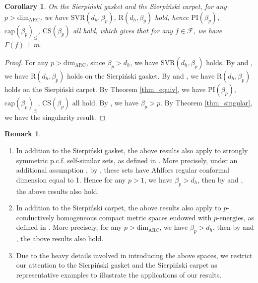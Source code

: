 \documentclass[11pt,a4paper]{article}
\numberwithin{equation}{section}
\theoremstyle{plain}
\newtheorem{corollary}[theorem]{Corollary}
\theoremstyle{definition}
\newtheorem{remark}[theorem]{Remark}
\begin{document}
\begin{corollary}\label{cor_SGSC}
On the Sierpi\'nski gasket and the Sierpi\'nski carpet, for any $p>\mathrm{dim}_{\mathrm{ARC}}$, we have \hyperlink{eq_SVRdb}{$\text{SVR}(d_h,\beta_p)$}, \hyperlink{eq_Rdb}{$\text{R}(d_h,\beta_p)$} hold, hence \hyperlink{eq_PIbeta}{$\text{PI}(\beta_p)$}, \hyperlink{eq_capbeta}{$\text{cap}(\beta_p)_\le$}, \hyperlink{eq_CSbeta}{$\text{CS}(\beta_p)$} all hold, which gives that for any $f\in\mathcal{F}$, we have $\Gamma(f)\perp m$.
\end{corollary}

\begin{proof}
For any $p>\mathrm{dim}_{\mathrm{ARC}}$, since $\beta_p>d_h$, we have \hyperlink{eq_SVRdb}{$\text{SVR}(d_h,\beta_p)$} holds. By \cite[Theorem 4.6]{Kig23} and \cite[Theorem 8.30]{KS24a}, we have \hyperlink{eq_Rdb}{$\text{R}(d_h,\beta_p)$} holds on the Sierpi\'nski gasket. By \cite[Theorem 3.21]{Kig23} and \cite[Theorem 8.19, Remark 8.20]{KS24a}, we have \hyperlink{eq_Rdb}{$\text{R}(d_h,\beta_p)$} holds on the Sierpi\'nski carpet. By Theorem \ref{thm_equiv}, we have \hyperlink{eq_PIbeta}{$\text{PI}(\beta_p)$}, \hyperlink{eq_capbeta}{$\text{cap}(\beta_p)_\le$}, \hyperlink{eq_CSbeta}{$\text{CS}(\beta_p)$} all hold. By \cite[Theorem 9.13, Theorem 9.8]{KS24a}, we have $\beta_p>p$. By Theorem \ref{thm_singular}, we have the singularity result.
\end{proof}

\begin{remark}\hspace{0em}
\begin{enumerate}[label=(\arabic*)]
\item In addition to the Sierpi\'nski gasket, the above results also apply to strongly symmetric p.c.f. self-similar sets, as defined in \cite[Definition 3.8.3, Definition 3.8.4]{Kig01book}. More precisely, under an additional assumption \cite[Assumption B.6]{KS24a}, by \cite[Theorem B.8]{KS24a}, these sets have Ahlfors regular conformal dimension equal to 1. Hence for any $p>1$, we have $\beta_p>d_h$, then by \cite[Theorem 4.6]{Kig23} and \cite[Theorem 8.30]{KS24a}, the above results also hold.
\item In addition to the Sierpi\'nski carpet, the above results also apply to $p$-conductively homogeneous compact metric spaces endowed with $p$-energies, as defined in \cite{Kig20LNM,Kig23}. More precisely, for any $p>\mathrm{dim}_{\mathrm{ARC}}$, we have $\beta_p>d_h$, then by \cite[Theorem 3.21]{Kig23} and \cite[Theorem 8.19]{KS24a}, the above results also hold.
\item Due to the heavy details involved in introducing the above spaces, we restrict our attention to the Sierpi\'nski gasket and the Sierpi\'nski carpet as representative examples to illustrate the applications of our results.
\end{enumerate}
\end{remark}
\end{document}
